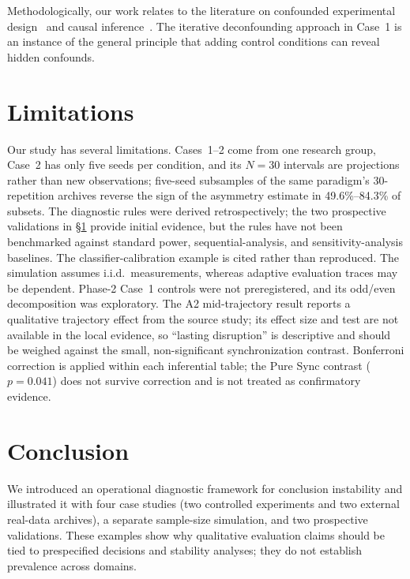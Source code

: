 \documentclass[11pt]{article}
\begin{document}
Methodologically, our work relates to the literature on confounded experimental design~\cite{shadish2002experimental} and causal inference~\cite{pearl2016causal}. The iterative deconfounding approach in Case~1 is an instance of the general principle that adding control conditions can reveal hidden confounds.

\section{Limitations}
\label{sec:limitations}

Our study has several limitations. Cases~1--2 come from one research group, Case~2 has only five seeds per condition, and its $N{=}30$ intervals are projections rather than new observations; five-seed subsamples of the same paradigm's 30-repetition archives reverse the sign of the asymmetry estimate in 49.6\%--84.3\% of subsets. The diagnostic rules were derived retrospectively; the two prospective validations in \S\ref{sec:limitations} provide initial evidence, but the rules have not been benchmarked against standard power, sequential-analysis, and sensitivity-analysis baselines. The classifier-calibration example is cited rather than reproduced. The simulation assumes i.i.d.\ measurements, whereas adaptive evaluation traces may be dependent. Phase-2 Case~1 controls were not preregistered, and its odd/even decomposition was exploratory. The A2 mid-trajectory result reports a qualitative trajectory effect from the source study; its effect size and test are not available in the local evidence, so ``lasting disruption'' is descriptive and should be weighed against the small, non-significant synchronization contrast. Bonferroni correction is applied within each inferential table; the Pure Sync contrast ($p{=}0.041$) does not survive correction and is not treated as confirmatory evidence.

\section{Conclusion}

We introduced an operational diagnostic framework for conclusion instability and illustrated it with four case studies (two controlled experiments and two external real-data archives), a separate sample-size simulation, and two prospective validations. These examples show why qualitative evaluation claims should be tied to prespecified decisions and stability analyses; they do not establish prevalence across domains.
\end{document}
